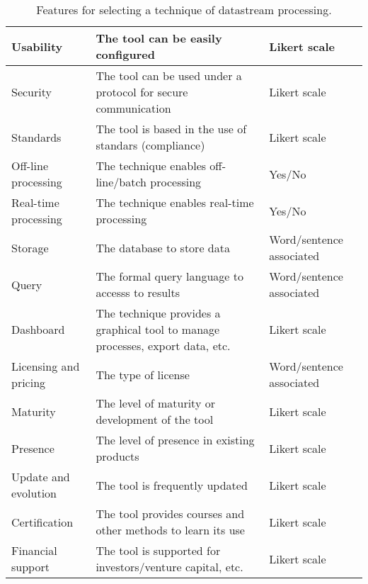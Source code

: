 \begin{table}[!ht]
\begin{center}
\begin{tabular}[c]{|p{2.5cm}|p{5cm}|p{3cm}|}
  Usability & The tool can be easily configured  & Likert scale  \\ \hline
  Security & The tool can be used under a protocol for secure communication & Likert scale  \\ \hline
  Standards & The tool is based in the use of standars (compliance) & Likert scale\ \\ \hline
  Off-line processing & The technique enables off-line/batch processing & Yes/No  \\ \hline
  Real-time processing & The technique enables real-time processing & Yes/No  \\ \hline
  Storage & The database to store data &  Word/sentence associated \\ \hline
  Query & The formal query language to accesss to results & Word/sentence associated\\ \hline
  Dashboard & The technique provides a graphical tool to manage processes, export data, etc. & Likert scale\ \\ \hline
  Licensing and pricing & The type of license & Word/sentence associated \\ \hline
  Maturity & The level of maturity or development of the tool & Likert scale\\ \hline
  Presence & The level of presence in existing products & Likert scale\\ \hline
  Update and evolution & The tool is frequently updated & Likert scale\\ \hline
  Certification & The tool provides courses and other methods to learn its use & Likert scale\\ \hline
  Financial support & The tool is supported for investors/venture capital, etc. & Likert scale\\ \hline
\hline
\end{tabular}
\caption{Features for selecting a technique of datastream processing.}\label{features-techniques}
  \end{center}
\end{table} 


